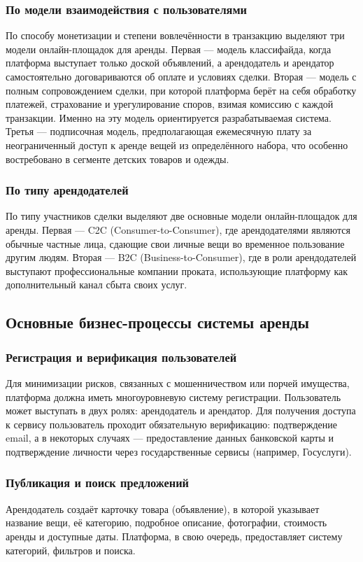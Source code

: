\subsubsection{По модели взаимодействия с пользователями}
По способу монетизации и степени вовлечённости в транзакцию выделяют три модели онлайн-площадок для аренды. Первая — модель классифайда, когда платформа выступает только доской объявлений, а арендодатель и арендатор самостоятельно договариваются об оплате и условиях сделки. Вторая — модель с полным сопровождением сделки, при которой платформа берёт на себя обработку платежей, страхование и урегулирование споров, взимая комиссию с каждой транзакции. Именно на эту модель ориентируется разрабатываемая система. Третья — подписочная модель, предполагающая ежемесячную плату за неограниченный доступ к аренде вещей из определённого набора, что особенно востребовано в сегменте детских товаров и одежды.
\subsubsection{По типу арендодателей}
По типу участников сделки выделяют две основные модели онлайн-площадок для аренды. Первая — C2C (Consumer-to-Consumer), где арендодателями являются обычные частные лица, сдающие свои личные вещи во временное пользование другим людям. Вторая — B2C (Business-to-Consumer), где в роли арендодателей выступают профессиональные компании проката, использующие платформу как дополнительный канал сбыта своих услуг.

\subsection{Основные бизнес-процессы системы аренды}
\subsubsection{Регистрация и верификация пользователей}
Для минимизации рисков, связанных с мошенничеством или порчей имущества, платформа должна иметь многоуровневую систему регистрации. Пользователь может выступать в двух ролях: арендодатель и арендатор. Для получения доступа к сервису пользователь проходит обязательную верификацию: подтверждение email, а в некоторых случаях — предоставление данных банковской карты и подтверждение личности через государственные сервисы (например, Госуслуги).
\subsubsection{Публикация и поиск предложений}
Арендодатель создаёт карточку товара (объявление), в которой указывает название вещи, её категорию, подробное описание, фотографии, стоимость аренды и доступные даты. Платформа, в свою очередь, предоставляет систему категорий, фильтров и поиска.
